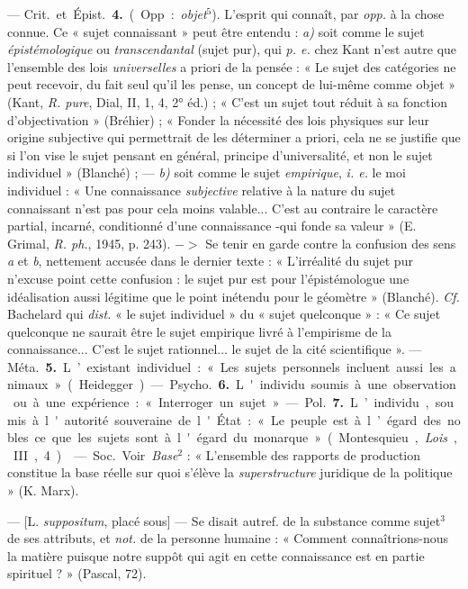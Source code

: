 \begin{itemize}[leftmargin=1cm, label=, itemsep=1pt]
—  \si{Crit.} et \si{Épist.} {\bf 4.} (Opp. :
{\it objet}$^5$). L'esprit qui connaît, par {\it opp.} à la chose connue. Ce
« sujet connaissant » peut être entendu : {\it a)} soit comme le sujet {\it
épistémologique} ou {\it transcendantal} (sujet pur), qui {\it p. e.} chez
Kant n’est autre que l’ensemble des lois {\it universelles} a priori de la
pensée : « Le sujet des catégories ne peut recevoir, du fait seul qu'il les
pense, un concept de lui-même comme objet » (Kant, {\it R. pure}, Dial, II,
1, 4, 2° éd.) ; « C’est un sujet tout réduit à sa fonction d’objectivation
» (Bréhier) ; « Fonder la nécessité des lois physiques sur leur origine
subjective qui permettrait de les déterminer a priori, cela ne se justifie
que si l'on vise le sujet pensant en général, principe d'universalité, et
non le sujet individuel » (Blanché) ; — {\it b)} soit comme le sujet {\it
empirique}, {\it i. e.} le moi individuel : « Une connaissance {\it
subjective} relative à la nature du sujet connaissant n’est pas pour cela
moins valable... C'est au contraire le caractère partial, incarné,
conditionné d’une connaissance -qui fonde sa valeur » (E. Grimal, {\it R.
ph.}, 1945, p. 243). $->$ Se
tenir en garde contre la confusion des sens {\it a} et {\it b}, nettement
accusée dans le dernier texte : « L’irréalité du sujet pur n’excuse point
cette confusion : le sujet pur est pour l’épistémologue une idéalisation
aussi légitime que le point inétendu pour le géomètre » (Blanché). {\it Cf.}
Bachelard qui {\it dist.} « le sujet individuel » du « sujet quelconque » :
« Ce sujet quelconque ne saurait être le sujet empirique livré à l’empirisme
de la connaissance... C'est le sujet rationnel... le sujet de la cité
scientifique ». — \si{Méta.} {\bf 5.} L’existant individuel : « Les sujets
personnels incluent aussi les animaux » (Heidegger).

— \si{Psycho.} {\bf 6.} L'individu soumis
à une observation ou à une expérience : « Interroger un sujet. »

— \si{Pol.} {\bf 7.} L’individu, soumis à l'autorité souveraine de l'État :
« Le peuple est à l’égard des nobles ce que les sujets sont à l'égard du
monarque » (Montesquieu, {\it Lois}, III, 4).

 — \si{Soc.} Voir {\it Base}$^2$ :
« L'ensemble des rapports de production constitue la base réelle sur
quoi s'élève la {\it superstructure} juridique de la politique » (K. Marx).

 — [L. {\it suppositum}, placé sous] — Se disait autref. de la
substance comme sujet$^3$ de ses attributs, et {\it not.} de la personne
humaine : « Comment connaîtrions-nous la matière puisque notre suppôt qui
agit en cette connaissance est en partie spirituel ? » (Pascal, 72).


\end{itemize}
